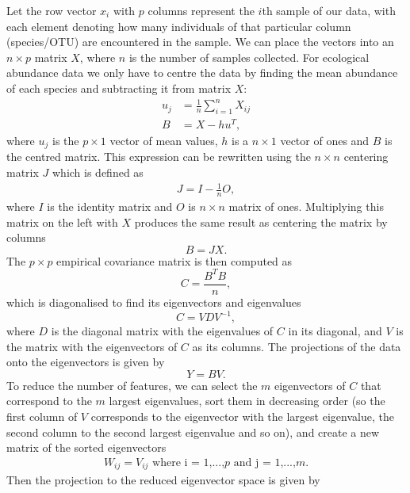 Let the row vector $x_i$ with $p$ columns represent the $i$th sample of our data, with each element denoting how many individuals of that particular column (species/OTU) are encountered in the sample. We can place the vectors into an $n \times p$ matrix $X$, where $n$ is the number of samples collected. For ecological abundance data we only have to centre the data by finding the mean abundance of each species and subtracting it from matrix $X$:
\begin{align}
\label{eq:columnmean}
u_j &= \frac{1}{n} \sum_{i = 1}^{n} X_{ij} \\
B &= X - h u^T,
\end{align}
where  $u_j$ is the $p\times 1$ vector of mean values, $h$ is a $n \times 1$ vector of ones and $B$ is the centred matrix. This expression can be rewritten  using the $n \times n$ centering matrix $J$ which is defined as
\begin{align}
J = I - \frac{1}{n}O,
\end{align}
where $I$ is the identity matrix and $O$ is $n \times n$ matrix of ones. Multiplying this matrix on the left with $X$ produces the same result as centering the matrix by columns
\begin{equation}
B = JX.
\end{equation}
The $p\times p$ empirical covariance matrix is then computed as
\begin{equation}
C = \frac{B^T B}{n},
\end{equation}
which is diagonalised to find its eigenvectors and eigenvalues \cite{franklin_matrix_2012}
\begin{equation}
C = VDV^{-1},
\end{equation}
where $D$ is the diagonal matrix with the eigenvalues of $C$ in its diagonal, and $V$ is the matrix with the eigenvectors of $C$ as its columns. The projections of the data onto the eigenvectors is given by 
\begin{equation}
Y = BV.
\end{equation}
To reduce the number of features, we can select the $m$ eigenvectors of $C$ that correspond to the $m$ largest eigenvalues, sort them in decreasing order (so the first column of $V$ corresponds to the eigenvector with the largest eigenvalue, the second column to the second largest eigenvalue and so on), and create a new matrix of the sorted eigenvectors
\begin{align}
W_{ij} = V_{ij} \text{ where i = 1,...,$p$ and j = 1,...,$m$}.
\end{align}
Then the projection to the reduced eigenvector space is given by
